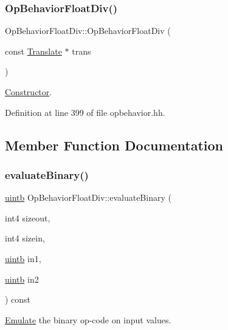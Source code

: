 \subsubsection{\texorpdfstring{OpBehaviorFloatDiv()}{OpBehaviorFloatDiv()}}
{\footnotesize\ttfamily Op\+Behavior\+Float\+Div\+::\+Op\+Behavior\+Float\+Div (\begin{DoxyParamCaption}\item[{const \mbox{\hyperlink{class_translate}{Translate}} $\ast$}]{trans }\end{DoxyParamCaption})\hspace{0.3cm}{\ttfamily [inline]}}



\mbox{\hyperlink{class_constructor}{Constructor}}. 



Definition at line 399 of file opbehavior.\+hh.



\subsection{Member Function Documentation}
\mbox{\label{class_op_behavior_float_div_a158c6ed93c6f39f5755746f0476bebce}} 
\subsubsection{\texorpdfstring{evaluateBinary()}{evaluateBinary()}}
{\footnotesize\ttfamily \mbox{\hyperlink{types_8h_a2db313c5d32a12b01d26ac9b3bca178f}{uintb}} Op\+Behavior\+Float\+Div\+::evaluate\+Binary (\begin{DoxyParamCaption}\item[{int4}]{sizeout,  }\item[{int4}]{sizein,  }\item[{\mbox{\hyperlink{types_8h_a2db313c5d32a12b01d26ac9b3bca178f}{uintb}}}]{in1,  }\item[{\mbox{\hyperlink{types_8h_a2db313c5d32a12b01d26ac9b3bca178f}{uintb}}}]{in2 }\end{DoxyParamCaption}) const\hspace{0.3cm}{\ttfamily [virtual]}}



\mbox{\hyperlink{class_emulate}{Emulate}} the binary op-\/code on input values. 


